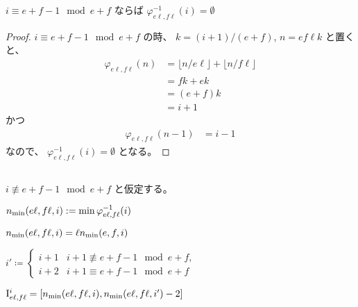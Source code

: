 \begin{lemma}
$
i \equiv e + f - 1 \mod e + f
$
ならば
$
\varphi_{e \ell, f \ell}^{-1}(i) = \emptyset
$
\end{lemma}

\begin{proof}
$
i \equiv e + f - 1 \mod e + f
$
の時、
$
k = (i + 1) / (e + f)
$,
$
n = e f \ell k
$
と置くと、
\begin{align}
\varphi_{e \ell, f \ell}(n)
&= \lfloor n / e \ell \rfloor + \lfloor n / f \ell \rfloor \\
&= f k + e k \\
&= (e + f) k \\
&= i + 1
\end{align}
かつ
\begin{align}
\varphi_{e \ell, f \ell}(n-1)
&= i - 1
\end{align}
なので、
$
\varphi_{e \ell, f \ell}^{-1}(i) = \emptyset
$
となる。
\end{proof}

\subsection{}
$
i \not \equiv e + f - 1 \mod e + f
$
と仮定する。

\begin{definition}
$
n_{\mathrm{min}}(e \ell, f \ell, i)
:=
\min \varphi_{e \ell, f \ell}^{-1}(i)
$
\end{definition}

\begin{lemma}
$
n_{\mathrm{min}}(e \ell, f \ell, i) = \ell n_{\mathrm{min}}(e, f, i)
$
\end{lemma}

\begin{definition}
$
i' \coloneqq
\begin{cases}
i + 1 & i + 1 \not \equiv e + f - 1 \mod e + f, \\
i + 2 & i + 1 \equiv e + f - 1 \mod e + f
\end{cases}
$
\end{definition}

\begin{lemma}
$
\mathrm{I}_{e \ell, f \ell}^i
=
[ n_{\mathrm{min}}(e \ell, f \ell, i), n_{\mathrm{min}}(e \ell, f \ell, i')-2 ]
$
\end{lemma}



